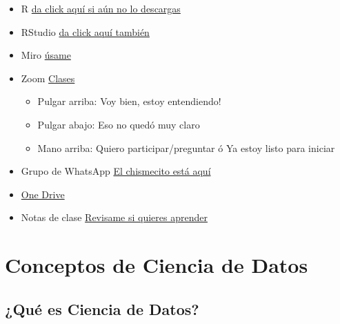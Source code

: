 \documentclass[
]{book}
\providecommand{\tightlist}{%
  \setlength{\itemsep}{0pt}\setlength{\parskip}{0pt}}
\begin{document}
\begin{itemize}
\tightlist
\item
  R \href{https://cran.r-project.org/}{da click aquí si aún no lo descargas}
\item
  RStudio \href{https://www.rstudio.com/products/rstudio/download/}{da click aquí también}
\item
  Miro \href{https://miro.com/welcomeonboard/WXJiSGtOUnE4Mm1EQnJaQWxIR2R6RGxPaVo5eXQ3bG1SMHNWSkVIZ09YQ3JlTHRma1dYcFJzbm9wZ05OVmxVMXwzMDc0NDU3MzU1MzI0OTQwMDI5?invite_link_id=632956861297}{úsame}
\item
  Zoom \href{https://us02web.zoom.us/j/5155440751?pwd=YzJCOGF0VnlZdlZlS0Fpc3MvZEhadz09}{Clases}

  \begin{itemize}
  \tightlist
  \item
    Pulgar arriba: Voy bien, estoy entendiendo!
  \item
    Pulgar abajo: Eso no quedó muy claro
  \item
    Mano arriba: Quiero participar/preguntar ó Ya estoy listo para iniciar
  \end{itemize}
\item
  Grupo de WhatsApp \href{https://chat.whatsapp.com/CNv5RxZb7FnLbzUFHGtYMG}{El chismecito está aquí}
\item
  \href{https://drive.google.com/drive/u/1/folders/16aKNbkhYfF-x6R2oh4RswSQOXN62UQX3}{One Drive}
\item
  Notas de clase \href{KaLizzyGam.github.io/index.html}{Revisame si quieres aprender}
\end{itemize}

\hypertarget{conceptos-de-ciencia-de-datos}{%
\chapter{Conceptos de Ciencia de Datos}\label{conceptos-de-ciencia-de-datos}}

\hypertarget{quuxe9-es-ciencia-de-datos}{%
\section{¿Qué es Ciencia de Datos?}\label{quuxe9-es-ciencia-de-datos}}
\end{document}
